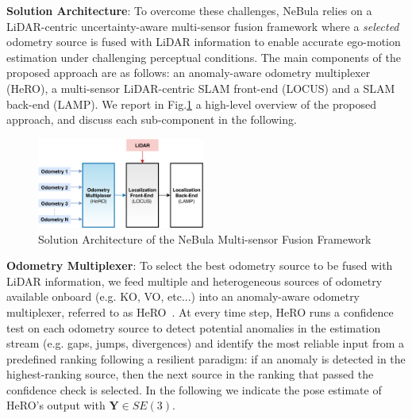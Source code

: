 \documentclass[letterpaper, 10pt, conference]{ieeeconf}      %
\newcommand{\ph}[1]{{\textbf{#1}:}} %
\newcommand{\rev}[1]{{\color{blue} #1 }} %
\begin{document}
\rev{\ph{Solution Architecture} To overcome these challenges, NeBula relies on a LiDAR-centric uncertainty-aware multi-sensor fusion framework where a \emph{selected} odometry source is fused with LiDAR information to enable accurate ego-motion estimation under challenging perceptual conditions. The main components of the proposed approach are as follows: \texit{(i)} an anomaly-aware odometry multiplexer (HeRO), \texit{(ii)} a multi-sensor LiDAR-centric SLAM front-end (LOCUS) and \texit{(ii)} a SLAM back-end (LAMP). We report in Fig.\ref{architecture} a high-level overview of the proposed approach, and discuss each sub-component in the following.} 



\begin{figure}[thpb]
  \centering
  \includegraphics[width=0.49\textwidth]{spot_iros/graphics/architecture.pdf}
  \caption{\rev{Solution Architecture of the NeBula Multi-sensor Fusion Framework}}
  \label{architecture}
\end{figure}



\rev{\ph{Odometry Multiplexer} To select the best odometry source to be fused with LiDAR information, we feed multiple and heterogeneous sources of odometry available onboard (e.g. KO, VO, etc...) into an anomaly-aware odometry multiplexer, referred to as HeRO~\cite{Santamaria-navarro2019}. At every time step, HeRO runs a confidence test on each odometry source to detect potential anomalies in the estimation stream (e.g. gaps, jumps, divergences) and identify the most reliable input from a predefined ranking following a resilient paradigm: if an anomaly is detected in the highest-ranking source, then the next source in the ranking that passed the confidence check is selected. %
In the following we indicate the pose estimate of HeRO's output with $\textbf{Y} \in SE(3)$.
}
\end{document}
